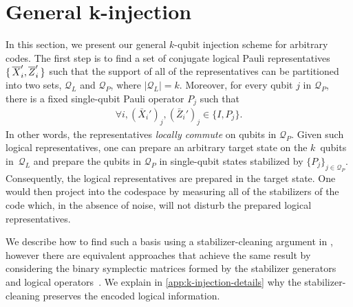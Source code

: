 \section{General k-injection}
\label{sec:k-injection} 
In this section, we present our general $ k $-qubit injection scheme for arbitrary codes. The first step is to
find a set of conjugate logical Pauli representatives $ \set{\overline{X}_i', \overline{Z}_i'} $ such that the support of all of the representatives can be partitioned into two sets, $\mathcal{Q}_L$ and $\mathcal{Q}_P$, where $|\mathcal{Q}_L| = k$. 
Moreover, for every qubit $j$ in $\mathcal{Q}_P$, there is a fixed single-qubit Pauli operator $P_j$ such that
\begin{align}
   \forall i,  (\bar{X}_i')_j, (\bar{Z}_i')_j \in \{ I, P_j \}.
\end{align}
In other words, the representatives \textit{locally commute} on qubits in $\mathcal{Q}_P$.
Given such logical representatives, one can prepare an arbitrary target state on the $k$~qubits in~$\mathcal{Q}_L$ and prepare the qubits in $\mathcal{Q}_P$ in single-qubit states stabilized by $\{ P_j \}_{j \in \mathcal{Q}_P}$.
Consequently, the logical representatives are prepared in the target state.
One would then project into the codespace by measuring all of the stabilizers of the code which, in the absence of noise, will not disturb the prepared logical representatives. 

We describe how to find such a basis using a stabilizer-cleaning argument in , however there are equivalent approaches that achieve the same result by considering the binary symplectic matrices formed by the stabilizer generators and logical operators~\cite{gottesman_stabilizer_1997,cowtan_parallel_2025,shi_stabilizer_2025}.
We explain in \cref{app:k-injection-details} why the stabilizer-cleaning preserves the encoded logical information. 

